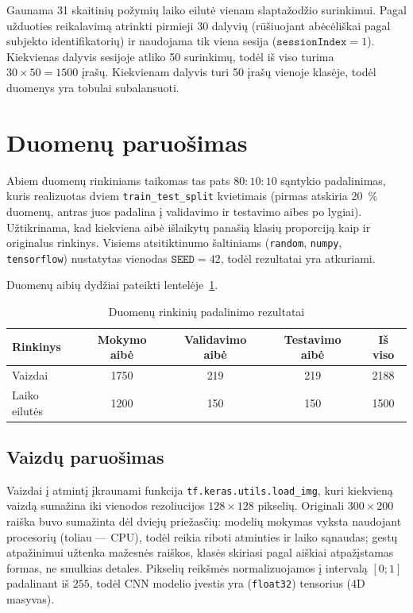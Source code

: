 \documentclass[]{VUMIFTemplateClass}
\begin{document}
Gaunama 31 skaitinių požymių laiko eilutė vienam slaptažodžio surinkimui. Pagal užduoties reikalavimą atrinkti pirmieji 30 dalyvių (rūšiuojant abėcėliškai pagal subjekto identifikatorių) ir naudojama tik viena sesija (\(\texttt{sessionIndex} = 1\)). Kiekvienas dalyvis sesijoje atliko 50 surinkimų, todėl iš viso turima \(30 \times 50 = 1500\) įrašų. Kiekvienam dalyvis turi 50 įrašų vienoje klasėje, todėl duomenys yra tobulai subalansuoti.


\section{Duomenų paruošimas}\label{sec:paruosimas}

Abiem duomenų rinkiniams taikomas tas pats \(80:10:10\) sąntykio padalinimas, kuris realizuotas dviem \texttt{train\_test\_split} kvietimais (pirmas atskiria 20~\% duomenų, antras juos padalina į validavimo ir testavimo aibes po lygiai). Užtikrinama, kad kiekviena aibė išlaikytų panašią klasių proporciją kaip ir originalus rinkinys. Visiems atsitiktinumo šaltiniams (\texttt{random}, \texttt{numpy}, \texttt{tensorflow}) nustatytas vienodas \(\texttt{SEED} = 42\), todėl rezultatai yra atkuriami.

Duomenų aibių dydžiai pateikti lentelėje~\ref{tab:splits}.

\begin{table}[H]
    \centering
    \caption{Duomenų rinkinių padalinimo rezultatai}
    \label{tab:splits}
    \begin{tabular}{|l|c|c|c|c|}
        \hline
        \textbf{Rinkinys} & \textbf{Mokymo aibė} & \textbf{Validavimo aibė} & \textbf{Testavimo aibė} & \textbf{Iš viso}\\
        \hline
        Vaizdai    & 1750 & 219 & 219 & 2188 \\
        \hline
        Laiko eilutės & 1200 & 150  & 150  & 1500 \\
        \hline
    \end{tabular}
\end{table}

\subsection{Vaizdų paruošimas}

Vaizdai į atmintį įkraunami funkcija \texttt{tf.keras.utils.load\_img}, kuri kiekvieną vaizdą sumažina iki vienodos rezoliucijos \(128 \times 128\) pikselių. Originali \(300 \times 200\) raiška buvo sumažinta dėl dviejų priežasčių: modelių mokymas vyksta naudojant procesorių (toliau --- CPU), todėl reikia riboti atminties ir laiko sąnaudas; gestų atpažinimui užtenka mažesnės raiškos, klasės skiriasi pagal aiškiai atpažįstamas formas, ne smulkias detales. Pikselių reikšmės normalizuojamos į intervalą \([0; 1]\) padalinant iš \(255\), todėl CNN modelio įvestis yra (\texttt{float32}) tensorius (4D masyvas).
\end{document}
